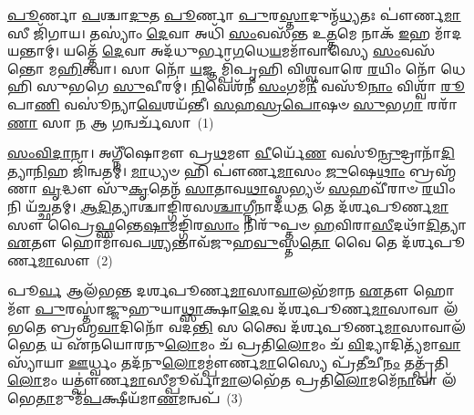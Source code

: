 
{\anuvakamend[{\-\ul{𑌪𑍂}\-𑌰𑍍𑌣𑌰𑍍\mbox{}𑌷᳴\-\ul{𑌯𑍋}\-\-𑌽𑌗𑍍𑌨𑌿\-\ul{𑌨𑌾} 𑌯𑍇 \ul{𑌦𑍇}\-𑌵𑌾𑌃 𑌸𑍂𑌰𑍍𑌯𑍋᳴ \ul{𑌮𑌾} 𑌸𑌨𑍍𑌤𑍍𑌵𑌾᳴ 𑌨𑌹𑍍𑌯𑌾𑌮𑌿 𑌵𑌷\-\ul{𑌟𑍍𑌕𑌾}\-𑌰𑌃 𑌸 𑌖᳴\-\ul{𑌦𑌿}\-𑌰 𑌉᳴𑌪\-\ul{𑌯𑌾}\-𑌮𑌗𑍃᳴𑌹𑍀𑌤𑍋\-𑌽\-\ul{𑌸𑌿} 𑌯𑌾𑌂 𑌵𑍈 𑌤𑍍𑌵𑍇 𑌕𑍍𑌰\-\ul{𑌤𑍁}\-𑌮𑍍𑌪𑍍𑌰 \ul{𑌦𑍇}\-𑌵𑌮𑍇𑌕𑌾᳴\-𑌦𑌶}]}%

\setcounter{anuvakam}{0}
\-\ul{𑌪𑍂}\-𑌰𑍍𑌣𑌾 \ul{𑌪}\-𑌶𑍍𑌚𑌾\-\ul{𑌦𑍁}\-𑌤 \ul{𑌪𑍂}\-𑌰𑍍𑌣𑌾 \ul{𑌪𑍁}\-𑌰\-\ul{𑌸𑍍𑌤𑌾}\-𑌦𑍁𑌨𑍍𑌮᳴\-\ul{𑌧𑍍𑌯}\-𑌤𑌃 𑌪𑍗॑𑌰𑍍𑌣\-\ul{𑌮𑌾}\-𑌸𑍀 𑌜𑌿᳴𑌗𑌾𑌯। 𑌤𑌸𑍍𑌯𑌾𑌂॑ \ul{𑌦𑍇}\-𑌵𑌾 𑌅𑌧𑌿᳴ \ul{𑌸𑌂}\-𑌵𑌸᳴𑌨𑍍𑌤 𑌉\-\ul{𑌤𑍍𑌤}\-𑌮𑍇 𑌨𑌾𑌕᳴ \ul{𑌇}\-𑌹 𑌮𑌾᳴𑌦𑌯𑌨𑍍𑌤𑌾𑌮𑍍। 𑌯𑌤𑍍𑌤𑍇᳴ \ul{𑌦𑍇}\-𑌵𑌾 𑌅𑌦᳴𑌧𑍁𑌰𑍍𑌭𑌾\-\ul{𑌗}\-𑌧𑍇\-\ul{𑌯}\-𑌮𑌮𑌾᳴𑌵𑌾𑌸𑍍𑌯𑍇 \ul{𑌸𑌂}\-𑌵𑌸᳴𑌨𑍍𑌤𑍋 𑌮\-\ul{𑌹𑌿}\-𑌤𑍍𑌵𑌾। 𑌸𑌾 𑌨𑍋᳴ \ul{𑌯}\-𑌜𑍍𑌞𑌮𑍍𑌪𑌿᳴𑌪𑍃𑌹𑌿 𑌵𑌿𑌶𑍍𑌵𑌵𑌾𑌰𑍇 \ul{𑌰}\-𑌯𑌿𑌂 𑌨𑍋᳴ 𑌧𑍇𑌹𑌿 𑌸𑍁𑌭𑌗𑍇 \ul{𑌸𑍁}\-𑌵𑍀𑌰𑌮𑍍॑। \ul{𑌨𑌿}\-𑌵𑍇𑌶᳴𑌨𑍀 \ul{𑌸𑌂}\-𑌗𑌮᳴\-\ul{𑌨𑍀} 𑌵𑌸𑍂᳴\-\ul{𑌨𑌾𑌂} 𑌵𑌿𑌶𑍍𑌵𑌾᳴ \ul{𑌰𑍂}\-𑌪𑌾\-\ul{𑌣𑌿} 𑌵𑌸𑍂॑𑌨𑍍𑌯𑌾\-\ul{𑌵𑍇}\-𑌶𑌯᳴𑌨𑍍𑌤𑍀। \ul{𑌸}\-\-\ul{𑌹}\-\-\ul{𑌸𑍍𑌰}\-\-\ul{𑌪𑍋}\-𑌷𑍞 \ul{𑌸𑍁}\-𑌭\-\ul{𑌗𑌾} 𑌰𑌰𑌾᳴\-\ul{𑌣𑌾} 𑌸𑌾 \ul{𑌨} 𑌆 \ul{𑌗}\-𑌨𑍍𑌵𑌰𑍍𑌚᳴𑌸𑌾~(1)

\-\ul{𑌸𑌂}\-\-\ul{𑌵𑌿}\-\-\ul{𑌦𑌾}\-𑌨𑌾। 𑌅𑌗𑍍𑌨𑍀᳴𑌷𑍋𑌮𑍗 𑌪𑍍𑌰\-\ul{𑌥}\-𑌮𑍗 \ul{𑌵𑍀}\-𑌰𑍍𑌯𑍇᳴\-\ul{𑌣} 𑌵𑌸𑍂॑\-\ul{𑌨𑍍𑌰𑍁}\-𑌦𑍍𑌰𑌾𑌨𑌾᳴\-\ul{𑌦𑌿}\-𑌤𑍍𑌯𑌾\-\ul{𑌨𑌿}\-𑌹 𑌜𑌿᳴𑌨𑍍𑌵𑌤𑌮𑍍। \ul{𑌮𑌾}\-𑌧𑍍𑌯𑍞 𑌹𑌿 𑌪𑍗॑𑌰𑍍𑌣\-\ul{𑌮𑌾}\-𑌸𑌂 \ul{𑌜𑍁}\-𑌷𑍇\-\ul{𑌥𑌾𑌂} 𑌬𑍍𑌰𑌹𑍍𑌮᳴𑌣𑌾 \ul{𑌵𑍃}\-𑌦𑍍𑌧𑍗 𑌸𑍁᳴\-\ul{𑌕𑍃}\-𑌤𑍇𑌨᳴ \ul{𑌸𑌾}\-𑌤𑌾𑌵\-\ul{𑌥𑌾}\-𑌸𑍍𑌮𑌭𑍍𑌯𑍞᳴ \ul{𑌸}\-𑌹𑌵𑍀᳴𑌰𑌾𑍞 \ul{𑌰}\-𑌯𑌿𑌂 𑌨𑌿 𑌯᳴𑌚𑍍𑌛𑌤𑌮𑍍। \ul{𑌆}\-\-\ul{𑌦𑌿}\-𑌤𑍍𑌯𑌾𑌶𑍍𑌚𑌾𑌙𑍍𑌗𑌿᳴𑌰𑌸\-\ul{𑌶𑍍𑌚𑌾}\-𑌗𑍍𑌨𑍀𑌨𑌾𑌦᳴𑌧\-\ul{𑌤} 𑌤𑍇 𑌦᳴𑌰𑍍\mbox{}𑌶𑌪𑍂𑌰𑍍𑌣\-\ul{𑌮𑌾}\-𑌸𑍗 𑌪𑍍𑌰𑍈\-\ul{𑌫𑍍𑌸}\-𑌨𑍍𑌤𑍇\-\ul{𑌷𑌾}\-𑌮𑌙𑍍𑌗𑌿᳴𑌰\-\ul{𑌸𑌾𑌂} 𑌨𑌿𑌰𑍁᳴𑌪𑍍𑌤𑍞 \ul{𑌹}\-𑌵𑌿𑌰𑌾\-\ul{𑌸𑍀}\-𑌦𑌥𑌾᳴\-\ul{𑌦𑌿}\-𑌤𑍍𑌯𑌾 \ul{𑌏}\-𑌤𑍗 𑌹𑍋𑌮𑌾᳴𑌵𑌪\-\ul{𑌶𑍍𑌯}\-𑌨𑍍𑌤𑌾𑌵᳴𑌜𑍁𑌹\-\ul{𑌵𑍁}\-𑌸𑍍𑌤\-\ul{𑌤𑍋} 𑌵𑍈 𑌤𑍇 𑌦᳴𑌰𑍍\mbox{}𑌶𑌪𑍂𑌰𑍍𑌣\-\ul{𑌮𑌾}\-𑌸𑍗~(2)

𑌪𑍂\-\ul{𑌰𑍍𑌵} 𑌆𑌲᳴𑌭𑌨𑍍𑌤 𑌦𑌰𑍍\mbox{}𑌶𑌪𑍂𑌰𑍍𑌣\-\ul{𑌮𑌾}\-𑌸𑌾\-\ul{𑌵𑌾}\-𑌲𑌭᳴𑌮𑌾𑌨 \ul{𑌏}\-𑌤𑍗 𑌹𑍋𑌮𑍗᳴ \ul{𑌪𑍁}\-𑌰𑌸𑍍𑌤𑌾॑𑌜𑍍𑌜𑍁𑌹𑍁𑌯𑌾\-\ul{𑌥𑍍𑌸𑌾}\-𑌕𑍍𑌷𑌾\-\ul{𑌦𑍇}\-𑌵 𑌦᳴𑌰𑍍\mbox{}𑌶𑌪𑍂𑌰𑍍𑌣\-\ul{𑌮𑌾}\-𑌸𑌾𑌵𑌾 𑌲᳴𑌭𑌤𑍇 𑌬𑍍𑌰𑌹𑍍𑌮\-\ul{𑌵𑌾}\-𑌦𑌿𑌨𑍋᳴ 𑌵𑌦\-\ul{𑌨𑍍𑌤𑌿} 𑌸 𑌤𑍍𑌵𑍈 𑌦᳴𑌰𑍍\mbox{}𑌶𑌪𑍂𑌰𑍍𑌣\-\ul{𑌮𑌾}\-𑌸𑌾𑌵𑌾\-𑌲᳴𑌭𑍇\-\ul{𑌤} 𑌯 𑌏᳴𑌨𑌯𑍋𑌰𑌨𑍁\-\ul{𑌲𑍋}\-𑌮𑌂 𑌚᳴ 𑌪𑍍𑌰𑌤𑌿\-\ul{𑌲𑍋}\-𑌮𑌂 𑌚᳴ \ul{𑌵𑌿}\-𑌦𑍍𑌯𑌾𑌦𑌿𑌤𑍍𑌯᳴𑌮𑌾\-\ul{𑌵𑌾}\-𑌸𑍍𑌯𑌾᳴𑌯𑌾 \ul{𑌊}\-𑌰𑍍𑌧𑍍𑌵𑌂 𑌤𑌦᳴𑌨𑍁\-\ul{𑌲𑍋}\-𑌮\-𑌮𑍍𑌪𑍗॑𑌰𑍍𑌣\-\ul{𑌮𑌾}\-𑌸𑍍𑌯𑍈 𑌪𑍍𑌰᳴\-\ul{𑌤𑍀}\-𑌚𑍀\-\ul{𑌨𑌂} 𑌤𑌤𑍍𑌪𑍍𑌰᳴𑌤𑌿\-\ul{𑌲𑍋}\-𑌮𑌂 𑌯𑌤𑍍𑌪𑍗॑𑌰𑍍𑌣\-\ul{𑌮𑌾}\-𑌸𑍀𑌮𑍍𑌪𑍂𑌰𑍍𑌵𑌾᳴\-\ul{𑌮𑌾}\-𑌲𑌭𑍇᳴𑌤 𑌪𑍍𑌰𑌤𑌿\-\ul{𑌲𑍋}\-𑌮𑌮𑍇᳴\-\ul{𑌨𑌾}\-𑌵𑌾 𑌲᳴𑌭𑍇\-\ul{𑌤𑌾}\-𑌮𑍁𑌮᳴\-\ul{𑌪}\-𑌕𑍍𑌷𑍀𑌯᳴𑌮𑌾\-\ul{𑌣}\-𑌮𑌨𑍍𑌵𑌪᳴~(3)

